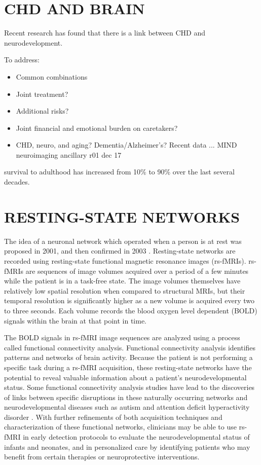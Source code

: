 \section{CHD AND BRAIN}

Recent research has found that there is a link between CHD and neurodevelopment.

To address:
\begin{itemize}
\item Common combinations
\item Joint treatment?
\item Additional risks?
\item Joint financial and emotional burden on caretakers? 
\item CHD, neuro, and aging? Dementia/Alzheimer's? Recent data ... MIND neuroimaging ancillary r01 dec 17
\end{itemize}

survival to adulthood has increased from 10\% to 90\% over the last several decades. 

\section{RESTING-STATE NETWORKS}

The idea of a neuronal network which operated when a person is at rest was proposed in 2001, and then confirmed in 2003 \cite{Raichle2001} \cite{Greicius2003}. Resting-state networks are recorded using resting-state functional magnetic resonance images (rs-fMRIs). rs-fMRIs are sequences of image volumes acquired over a period of a few minutes while the patient is in a task-free state. The image volumes themselves have relatively low spatial resolution when compared to structural MRIs, but their temporal resolution is significantly higher as a new volume is acquired every two to three seconds. Each volume records the blood oxygen level dependent (BOLD) signals within the brain at that point in time. 

The BOLD signals in rs-fMRI image sequences are analyzed using a process called functional connectivity analysis. Functional connectivity analysis identifies patterns and networks of brain activity. Because the patient is not performing a specific task during a rs-fMRI acquisition, these resting-state networks have the potential to reveal valuable information about a patient's neurodevelopmental status. Some functional connectivity analysis studies have lead to the discoveries of links between specific disruptions in these naturally occurring networks and neurodevelopmental diseases such as autism and attention deficit hyperactivity disorder \cite{Assaf2010} \cite{Zang2007}. With further refinements of both acquisition techniques and characterization of these functional networks, clinicians may be able to use rs-fMRI in early detection protocols to evaluate the neurodevelopmental status of infants and neonates, and in personalized care by identifying patients who may benefit from certain therapies or neuroprotective interventions.


